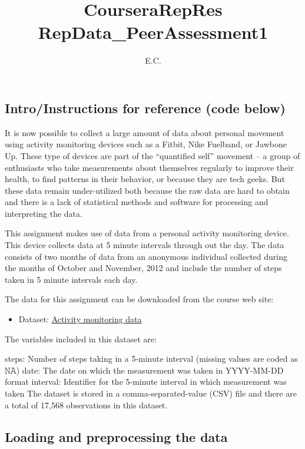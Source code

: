 \documentclass[
]{article}
\title{CourseraRepRes RepData\_PeerAssessment1}
\author{E.C.}
\date{}
\providecommand{\tightlist}{%
  \setlength{\itemsep}{0pt}\setlength{\parskip}{0pt}}
\begin{document}
\maketitle

\hypertarget{introinstructions-for-reference-code-below}{%
\subsection{Intro/Instructions for reference (code
below)}\label{introinstructions-for-reference-code-below}}

It is now possible to collect a large amount of data about personal
movement using activity monitoring devices such as a Fitbit, Nike
Fuelband, or Jawbone Up. These type of devices are part of the
``quantified self'' movement -- a group of enthusiasts who take
measurements about themselves regularly to improve their health, to find
patterns in their behavior, or because they are tech geeks. But these
data remain under-utilized both because the raw data are hard to obtain
and there is a lack of statistical methods and software for processing
and interpreting the data.

This assignment makes use of data from a personal activity monitoring
device. This device collects data at 5 minute intervals through out the
day. The data consists of two months of data from an anonymous
individual collected during the months of October and November, 2012 and
include the number of steps taken in 5 minute intervals each day.

The data for this assignment can be downloaded from the course web site:

\begin{itemize}
\tightlist
\item
  Dataset:
  \href{https://d396qusza40orc.cloudfront.net/repdata\%2Fdata\%2Factivity.zip}{Activity
  monitoring data}
\end{itemize}

The variables included in this dataset are:

steps: Number of steps taking in a 5-minute interval (missing values are
coded as 𝙽𝙰) date: The date on which the measurement was taken in
YYYY-MM-DD format interval: Identifier for the 5-minute interval in
which measurement was taken The dataset is stored in a
comma-separated-value (CSV) file and there are a total of 17,568
observations in this dataset.

\hypertarget{loading-and-preprocessing-the-data}{%
\subsection{Loading and preprocessing the
data}\label{loading-and-preprocessing-the-data}}
\end{document}

